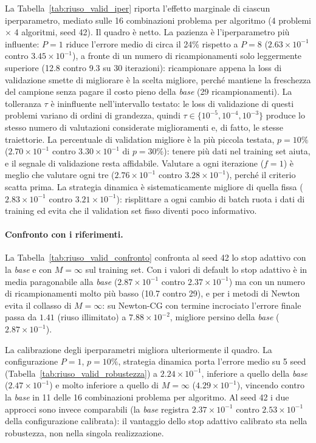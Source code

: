 La Tabella~\ref{tab:riuso_valid_iper} riporta l'effetto marginale di
ciascun iperparametro, mediato sulle 16 combinazioni problema per algoritmo
(4 problemi $\times$ 4 algoritmi, seed 42). Il quadro è netto. La pazienza è
l'iperparametro più influente: $P=1$ riduce l'errore medio di circa il 24\%
rispetto a $P=8$ ($2.63\times10^{-1}$ contro $3.45\times10^{-1}$), a fronte
di un numero di ricampionamenti solo leggermente superiore (12.8 contro 9.3
su 30 iterazioni): ricampionare appena la loss di validazione smette di
migliorare è la scelta migliore, perché mantiene la freschezza del campione
senza pagare il costo pieno della \emph{base} (29 ricampionamenti). La
tolleranza $\tau$ è ininfluente nell'intervallo testato: le loss di
validazione di questi problemi variano di ordini di grandezza, quindi
$\tau \in \{10^{-5},10^{-4},10^{-3}\}$ produce lo stesso numero di
valutazioni considerate miglioramenti e, di fatto, le stesse traiettorie. La
percentuale di validation migliore è la più piccola testata, $p=10\%$
($2.70\times10^{-1}$ contro $3.30\times10^{-1}$ di $p=30\%$): tenere più dati
nel training set aiuta, e il segnale di validazione resta affidabile.
Valutare a ogni iterazione ($f=1$) è meglio che valutare ogni tre
($2.76\times10^{-1}$ contro $3.28\times10^{-1}$), perché il criterio scatta
prima. La strategia dinamica è sistematicamente migliore di quella fissa
($2.83\times10^{-1}$ contro $3.21\times10^{-1}$): risplittare a ogni cambio
di batch ruota i dati di training ed evita che il validation set fisso
diventi poco informativo.

\paragraph{Confronto con i riferimenti.}
La Tabella~\ref{tab:riuso_valid_confronto} confronta al seed 42 lo stop
adattivo con la \emph{base} e con $M=\infty$ sul training set. Con i valori
di default lo stop adattivo è in media paragonabile alla \emph{base}
($2.87\times10^{-1}$ contro $2.37\times10^{-1}$) ma con un numero di
ricampionamenti molto più basso (10.7 contro 29), e per i metodi di Newton
evita il collasso di $M=\infty$: su Newton-CG con termine incrociato
l'errore finale passa da $1.41$ (riuso illimitato) a $7.88\times10^{-2}$,
migliore persino della \emph{base} ($2.87\times10^{-1}$).

La calibrazione degli iperparametri migliora ulteriormente il quadro. La
configurazione $P=1$, $p=10\%$, strategia dinamica porta l'errore medio su 5
seed (Tabella~\ref{tab:riuso_valid_robustezza}) a
$2.24\times10^{-1}$, inferiore a quello della \emph{base}
($2.47\times10^{-1}$) e molto inferiore a quello di $M=\infty$
($4.29\times10^{-1}$), vincendo contro la \emph{base} in 11 delle 16
combinazioni problema per algoritmo. Al seed 42 i due approcci sono invece
comparabili (la \emph{base} registra $2.37\times10^{-1}$ contro
$2.53\times10^{-1}$ della configurazione calibrata): il vantaggio dello stop
adattivo calibrato sta nella robustezza, non nella singola realizzazione.

